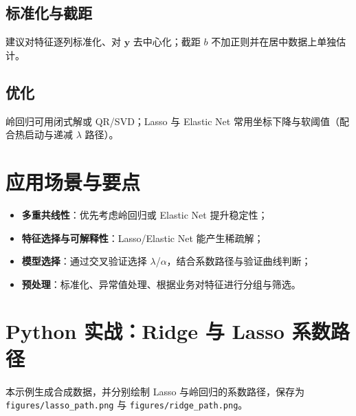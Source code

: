 \documentclass[UTF8,zihao=-4]{ctexart}
\begin{document}
\subsection{标准化与截距}
建议对特征逐列标准化、对 \(\mathbf{y}\) 去中心化；截距 \(b\) 不加正则并在居中数据上单独估计。

\subsection{优化}
岭回归可用闭式解或 QR/SVD；Lasso 与 Elastic Net 常用坐标下降与软阈值（配合热启动与递减 \(\lambda\) 路径）。

\section{应用场景与要点}
\begin{itemize}
  \item \textbf{多重共线性}：优先考虑岭回归或 Elastic Net 提升稳定性；
  \item \textbf{特征选择与可解释性}：Lasso/Elastic Net 能产生稀疏解；
  \item \textbf{模型选择}：通过交叉验证选择 \(\lambda\)/\(\alpha\)，结合系数路径与验证曲线判断；
  \item \textbf{预处理}：标准化、异常值处理、根据业务对特征进行分组与筛选。
\end{itemize}

\section{Python 实战：Ridge 与 Lasso 系数路径}
本示例生成合成数据，并分别绘制 Lasso 与岭回归的系数路径，保存为 \texttt{figures/lasso\_path.png} 与 \texttt{figures/ridge\_path.png}。
\end{document}
